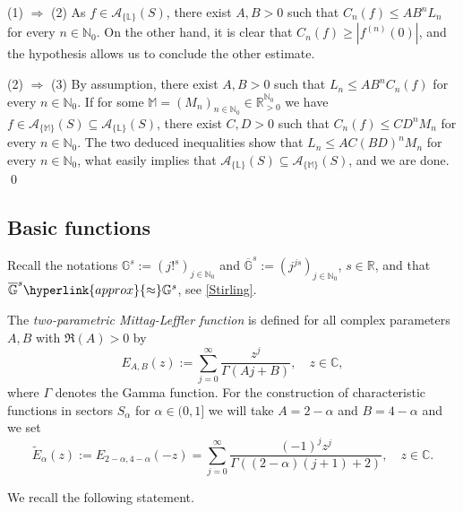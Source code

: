 \documentclass[11pt,a4paper]{article}
\theoremstyle{plain}
\theoremstyle{definition}
\newcommand{\RR}{\mathbb{R}}
\newcommand{\CC}{\mathbb{C}}
\newcommand{\NN}{\mathbb{N}}
\newcommand{\M}{\mathbb{M}}
\newcommand{\LL}{\mathbb{L}}
\newcommand{\G}{\mathbb{G}}
\begin{document}
(1) $\Rightarrow$ (2) As $f\in \mathcal{A}_{\{\LL\}} (S)$, there exist $A,B>0$ such that $C_n(f)\le AB^nL_n$ for every $n\in\NN_0$. On the other hand, it is clear that $C_n(f)\geq |f^{(n)}(0)|$, and the hypothesis allows us to conclude the other estimate.

(2)  $\Rightarrow$ (3) By assumption, there exist $A,B>0$ such that $L_n\le A{B}^nC_n(f)$ for every $n\in\NN_0$. If for some $\M=(M_n)_{n\in\NN_0}\in\RR_{>0}^{\NN_0}$ we have $f\in \mathcal{A}_{\{\M\}} (S)\subseteq \mathcal{A}_{\{\LL\}} (S)$, there exist $C,D>0$ such that $C_n(f)\le C {D}^nM_n$ for every $n\in\NN_0$. The two deduced inequalities show that $L_n\le{ AC(BD)^n}M_n$ for every $n\in\NN_0$, what easily implies that $\mathcal{A}_{\{\LL\}} (S)\subseteq \mathcal{A}_{\{\M\}} (S)$, and we are done.
\qed\enddemo

\subsection{Basic functions}\label{ssect.BasicFct}

Recall the notations {$\G^s:=(j!^s)_{j\in\NN_0}$ and }$\overline{\G}^s:=(j^{js})_{j\in\NN_0}$, $s\in\RR$, and that $\overline{\G}^s\hyperlink{approx}{\approx}\G^s$, see \eqref{Stirling}.\vspace{6pt}


The \textit{{two-parametric} Mittag-Leffler function} is defined for all {complex parameters $A, B$ with $\Re(A)>0$} by
$$E_{A,B}(z):=\sum_{j=0}^\infty \frac{z^j}{\Gamma (Aj+B)},\quad z\in\CC,$$
where $\Gamma$ denotes the Gamma function.
For the construction of characteristic functions in sectors $S_\alpha$ for $\alpha\in(0,1]$ we will take $A=2-\alpha$ and $B=4-\alpha$ and we set
\begin{equation*}%
	\widetilde{E}_{\alpha}(z):=E_{2-\alpha, 4-\alpha}(-z){=\sum_{j=0}^\infty \frac{(-1)^jz^j}{\Gamma ((2-\alpha)(j+1)+2)},\quad z\in\CC}.
\end{equation*}

We recall the following statement.
\end{document}
